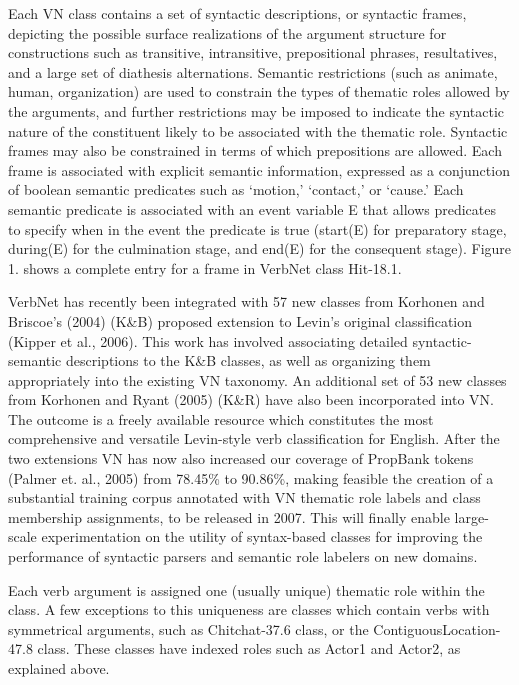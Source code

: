   Each VN class contains a set of syntactic descriptions, or syntactic frames, depicting the possible surface realizations of the argument structure for constructions such as transitive, intransitive, prepositional phrases, resultatives, and a large set of diathesis alternations. Semantic restrictions (such as animate, human, organization) are used to constrain the types of thematic roles allowed by the arguments, and further restrictions may be imposed to indicate the syntactic nature of the constituent likely to be associated with the thematic role. Syntactic frames may also be constrained in terms of which prepositions are allowed. Each frame is associated with explicit semantic information, expressed as a conjunction of boolean semantic predicates such as `motion,' `contact,' or `cause.' Each semantic predicate is associated with an event variable E that allows predicates to specify when in the event the predicate is true (start(E) for preparatory stage, during(E) for the culmination stage, and end(E) for the consequent stage). Figure 1. shows a complete entry for a frame in VerbNet class Hit-18.1.

  VerbNet has recently been integrated with 57 new classes from Korhonen and Briscoe's (2004) (K\&B) proposed extension to Levin's original classification (Kipper et al., 2006). This work has involved associating detailed syntactic-semantic descriptions to the K\&B classes, as well as organizing them appropriately into the existing VN taxonomy. An additional set of 53 new classes from Korhonen and Ryant (2005) (K\&R) have also been incorporated into VN. The outcome is a freely available resource which constitutes the most comprehensive and versatile Levin-style verb classification for English. After the two extensions VN has now also increased our coverage of PropBank tokens (Palmer et. al., 2005) from 78.45\% to 90.86\%, making feasible the creation of a substantial training corpus annotated with VN thematic role labels and class membership assignments, to be released in 2007. This will finally enable large-scale experimentation on the utility of syntax-based classes for improving the performance of syntactic parsers and semantic role labelers on new domains.

  Each verb argument is assigned one (usually unique) thematic role within the class. A few exceptions to this uniqueness are classes which contain verbs with symmetrical arguments, such as Chitchat-37.6 class, or the ContiguousLocation-47.8 class. These classes have indexed roles such as Actor1 and Actor2, as explained above.

